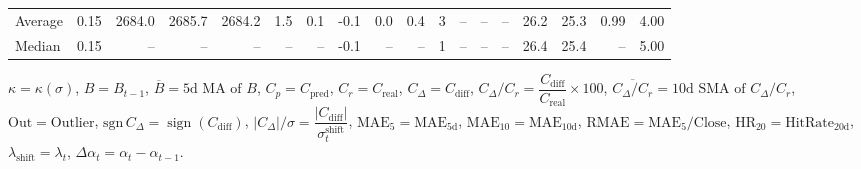 \begin{threeparttable}
{\begin{tabular}{lrrrrrrrrrrrrrrrrr}
Average &     0.15 & 2684.0 & 2685.7 & 2684.2 &        1.5 &            0.1 &                      -0.1 &                      0.0 &                 0.4 &              3 &         -- &        -- &             -- &             26.2 &                25.3 &            0.99 &                   4.00 \\
 Median &     0.15 &     -- &     -- &     -- &         -- &             -- &                      -0.1 &                       -- &                  -- &              1 &         -- &        -- &             -- &             26.4 &                25.4 &              -- &                   5.00 \\
\bottomrule
\end{tabular}
}
\begin{tablenotes}\footnotesize
\item $\kappa=\kappa(\sigma)$, $B=B_{t-1}$, $\overline{B}=\text{5d MA of }B$, $C_p=C_{\text{pred}}$, $C_r=C_{\text{real}}$, $C_\Delta=C_{\text{diff}}$, $C_\Delta/C_r=\dfrac{C_{\text{diff}}}{C_{\text{real}}}\times100$, $\overline{C_\Delta/C_r}=\text{10d SMA of }C_\Delta/C_r$, $\mathrm{Out}=\text{Outlier}$, $\mathrm{sgn}\,C_\Delta=\operatorname{sign}(C_{\text{diff}})$, $|C_\Delta|/\sigma=\dfrac{|C_{\text{diff}}|}{\sigma_t^{\text{shift}}}$, $\mathrm{MAE}_5=\mathrm{MAE}_{5\text{d}}$, $\mathrm{MAE}_{10}=\mathrm{MAE}_{10\text{d}}$, $\mathrm{RMAE}= \mathrm{MAE}_5 / \text{Close}$, $\mathrm{HR}_{20}=\mathrm{HitRate}_{20\text{d}}$, $\lambda_{\text{shift}}=\lambda_t$, $\Delta\alpha_t=\alpha_t-\alpha_{t-1}$.
\end{tablenotes}
\end{threeparttable}
\endgroup

